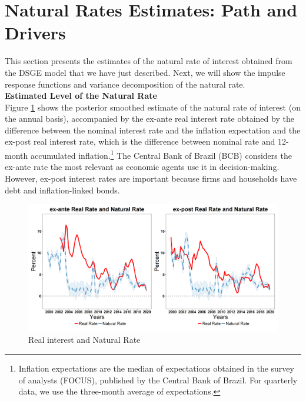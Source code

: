 \documentclass[12pt,oneside,a4paper]{article}
\begin{document}
\section{Natural Rates Estimates: Path and Drivers}
This section presents the estimates of the natural rate of interest obtained from the DSGE model that we have just described. Next, we will show the impulse response functions and variance decomposition of the natural rate.  \\

\textbf{Estimated Level of the Natural Rate} \\

Figure \ref{fig:Real_Natural_rate} shows the posterior smoothed estimate of the natural rate of interest (on the annual basis), accompanied by the ex-ante real interest rate obtained by the difference between the nominal interest rate and the inflation expectation and the ex-post real interest rate, which is the difference between nominal rate and 12-month accumulated inflation.\footnote{Inflation expectations are the median of expectations obtained in the survey of analysts (FOCUS), published by the Central Bank of Brazil. For quarterly data, we use the three-month average of expectations.} The Central Bank of Brazil (BCB) considers the ex-ante rate the most relevant as economic agents use it in decision-making. However, ex-post interest rates are important because firms and households have debt and inflation-linked bonds.


\begin{figure}[H]
\begin{center}
\caption{Real interest and Natural Rate}
\label{fig:Real_Natural_rate}
\includegraphics[scale=0.52]{Capitulo_1/Juros_Natural_Juros_Real.png}
\end{center}
\end{figure}
\end{document}
